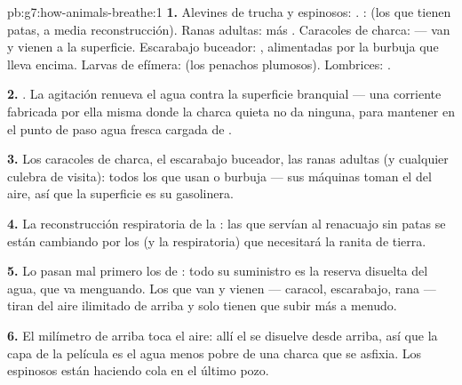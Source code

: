 \begin{solution}{pb:g7:how-animals-breathe:1}
\textbf{1.} Alevines de trucha y espinosos: . :
 (los que tienen patas, a media reconstrucción). Ranas
adultas:  más . Caracoles de charca:  --- van y
vienen a la superficie. Escarabajo buceador: , alimentadas por
la burbuja que lleva encima. Larvas de efímera:  (los penachos
plumosos). Lombrices: .

\textbf{2.} . La agitación renueva el agua contra la
superficie branquial --- una corriente fabricada por ella misma donde
la charca quieta no da ninguna, para mantener en el punto de paso agua
fresca cargada de .

\textbf{3.} Los caracoles de charca, el escarabajo buceador, las ranas
adultas (y cualquier culebra de visita): todos los que usan  o
burbuja --- sus máquinas toman el  del aire, así que la
superficie es su gasolinera.

\textbf{4.} La reconstrucción respiratoria de la : las
 que servían al renacuajo sin patas se están cambiando por los
 (y la  respiratoria) que necesitará la ranita de tierra.

\textbf{5.} Lo pasan mal primero los de : todo su suministro
es la reserva disuelta del agua, que va menguando. Los que van y vienen
--- caracol, escarabajo, rana --- tiran del aire ilimitado de arriba y
solo tienen que subir más a menudo.

\textbf{6.} El milímetro de arriba toca el aire: allí el  se
disuelve desde arriba, así que la capa de la película es el agua menos
pobre de una charca que se asfixia. Los espinosos están haciendo cola
en el último pozo.


\end{solution}
